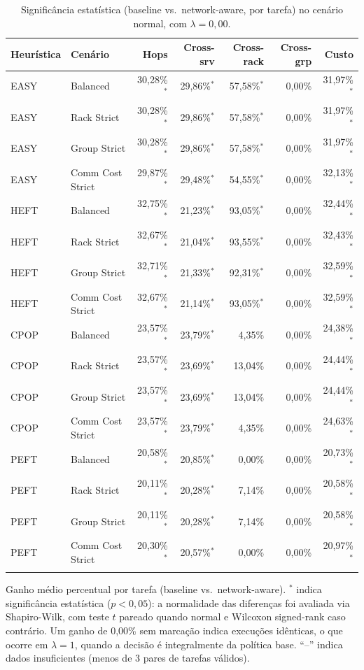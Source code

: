 \begin{table}[htbp]
\centering
\small
\caption{Significância estatística (baseline vs.\ network-aware, por tarefa) no cenário normal, com $\lambda = 0{,}00$.}
\label{tab:significancia_normal_lambda_000}
\begin{tabular}{llrrrrr}
\toprule
Heurística & Cenário & Hops & Cross-srv & Cross-rack & Cross-grp & Custo \\
\midrule
EASY & Balanced & 30,28\%$^{*}$ & 29,86\%$^{*}$ & 57,58\%$^{*}$ & 0,00\% & 31,97\%$^{*}$ \\
EASY & Rack Strict & 30,28\%$^{*}$ & 29,86\%$^{*}$ & 57,58\%$^{*}$ & 0,00\% & 31,97\%$^{*}$ \\
EASY & Group Strict & 30,28\%$^{*}$ & 29,86\%$^{*}$ & 57,58\%$^{*}$ & 0,00\% & 31,97\%$^{*}$ \\
EASY & Comm Cost Strict & 29,87\%$^{*}$ & 29,48\%$^{*}$ & 54,55\%$^{*}$ & 0,00\% & 32,13\%$^{*}$ \\
\addlinespace
HEFT & Balanced & 32,75\%$^{*}$ & 21,23\%$^{*}$ & 93,05\%$^{*}$ & 0,00\% & 32,44\%$^{*}$ \\
HEFT & Rack Strict & 32,67\%$^{*}$ & 21,04\%$^{*}$ & 93,55\%$^{*}$ & 0,00\% & 32,43\%$^{*}$ \\
HEFT & Group Strict & 32,71\%$^{*}$ & 21,33\%$^{*}$ & 92,31\%$^{*}$ & 0,00\% & 32,59\%$^{*}$ \\
HEFT & Comm Cost Strict & 32,67\%$^{*}$ & 21,14\%$^{*}$ & 93,05\%$^{*}$ & 0,00\% & 32,59\%$^{*}$ \\
\addlinespace
CPOP & Balanced & 23,57\%$^{*}$ & 23,79\%$^{*}$ & 4,35\% & 0,00\% & 24,38\%$^{*}$ \\
CPOP & Rack Strict & 23,57\%$^{*}$ & 23,69\%$^{*}$ & 13,04\% & 0,00\% & 24,44\%$^{*}$ \\
CPOP & Group Strict & 23,57\%$^{*}$ & 23,69\%$^{*}$ & 13,04\% & 0,00\% & 24,44\%$^{*}$ \\
CPOP & Comm Cost Strict & 23,57\%$^{*}$ & 23,79\%$^{*}$ & 4,35\% & 0,00\% & 24,63\%$^{*}$ \\
\addlinespace
PEFT & Balanced & 20,58\%$^{*}$ & 20,85\%$^{*}$ & 0,00\% & 0,00\% & 20,73\%$^{*}$ \\
PEFT & Rack Strict & 20,11\%$^{*}$ & 20,28\%$^{*}$ & 7,14\% & 0,00\% & 20,58\%$^{*}$ \\
PEFT & Group Strict & 20,11\%$^{*}$ & 20,28\%$^{*}$ & 7,14\% & 0,00\% & 20,58\%$^{*}$ \\
PEFT & Comm Cost Strict & 20,30\%$^{*}$ & 20,57\%$^{*}$ & 0,00\% & 0,00\% & 20,97\%$^{*}$ \\
\addlinespace
\bottomrule
\end{tabular}

\vspace{2mm}
\footnotesize Ganho médio percentual por tarefa (baseline vs.\ network-aware). $^{*}$ indica significância estatística ($p<0{,}05$): a normalidade das diferenças foi avaliada via Shapiro-Wilk, com teste $t$ pareado quando normal e Wilcoxon signed-rank caso contrário. Um ganho de 0,00\% sem marcação indica execuções idênticas, o que ocorre em $\lambda = 1$, quando a decisão é integralmente da política base. ``--'' indica dados insuficientes (menos de 3 pares de tarefas válidos).
\end{table}
